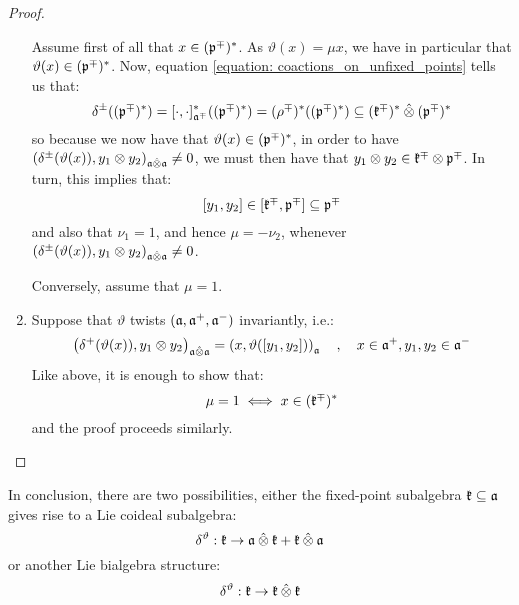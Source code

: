 \begin{proof}
\begin{enumerate}
                    Assume first of all that $x \in (\mathfrak{p}^{\mp})^*$. As $\vartheta(x) = \mu x$, we have in particular that $\vartheta(x) \in (\mathfrak{p}^{\mp})^*$. Now, equation \eqref{equation: coactions_on_unfixed_points} tells us that:
                        $$\delta^{\pm}( (\p^{\mp})^* ) = [\cdot, \cdot]_{\a^{\mp}}^*( (\p^{\mp})^* ) = (\rho^{\mp})^*((\p^{\mp})^*) \subseteq (\k^{\mp})^* \hattensor (\p^{\mp})^*$$
                    so because we now have that $\vartheta(x) \in (\mathfrak{p}^{\mp})^*$, in order to have $\left( \delta^{\pm}( \vartheta(x) ), y_1 \tensor y_2 \right)_{\a \hattensor \a} \not = 0$, we must then have that $y_1 \tensor y_2 \in \k^{\mp} \tensor \p^{\mp}$. In turn, this implies that:
                        $$[y_1, y_2] \in [\mathfrak{k}^{\mp}, \mathfrak{p}^{\mp}] \subseteq \mathfrak{p}^{\mp}$$
                    and also that $\nu_1 = 1$, and hence $\mu = -\nu_2$, whenever $\left( \delta^{\pm}( \vartheta(x) ), y_1 \tensor y_2 \right)_{\a \hattensor \a} \not = 0$.

                    Conversely, assume that $\mu = 1$.
                    \item Suppose that $\vartheta$ twists $(\mathfrak{a}, \mathfrak{a}^+, \mathfrak{a}^-)$ invariantly, i.e.:
                        $$\left( \delta^+( \vartheta(x) ), y_1 \tensor y_2 \right)_{\a \hattensor \a} = \left( x, \vartheta( [y_1, y_2] ) \right)_{\a} \quad, \quad x \in \a^+, y_1, y_2 \in \a^-$$
                    Like above, it is enough to show that:
                        $$\mu = 1 \iff x \in (\mathfrak{k}^{\mp})^*$$
                    and the proof proceeds similarly.
                \end{enumerate}
            \end{proof}
        
        
        In conclusion, there are two possibilities, either the fixed-point subalgebra $\mathfrak{k} \subseteq \mathfrak{a}$ gives rise to a Lie coideal subalgebra:
            $$\delta^{\vartheta}: \k \to \a \hattensor \k + \k \hattensor \a$$
        or another Lie bialgebra structure:
            $$\delta^{\vartheta}: \k \to \k \hattensor \k$$

